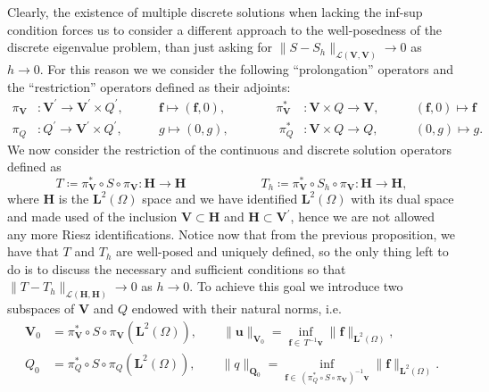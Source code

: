 \documentclass[USenglish]{article}
\theoremstyle{dgthm}
\theoremstyle{dgdef}
\let\vec\bm
\newcommand\norm[1]{\lVert#1\rVert}
\begin{document}
Clearly, the existence of multiple discrete solutions when lacking the inf-sup condition forces us to consider a different approach to the well-posedness of the discrete eigenvalue problem, than just asking for $\norm{S-S_h}_{\mathcal{L}(\vec{V},\vec{V})}\to 0$ as $h\to 0$.
For this reason we we consider the following ``prolongation'' operators and the ``restriction'' operators defined as their adjoints:
\begin{equation}
  \begin{aligned}
    \pi_{\vec{V}}&:\vec{V}^\prime \to \vec{V}^\prime\times Q^\prime, \qquad &\vec{f}\mapsto (\vec{f},0),  \qquad\qquad \pi_{\vec{V}}^\ast&:\vec{V}\times Q \to \vec{V}, \qquad &(\vec{f},0) \mapsto \vec{f}\\ 
    \pi_{Q}&:Q^\prime \to \vec{V}^\prime\times Q^\prime, \qquad &g\mapsto (0,g),  \qquad\qquad \pi_{Q}^\ast&:\vec{V}\times Q \to Q, \qquad &(0,g) \mapsto g.
  \end{aligned}
\end{equation}
We now consider the restriction of the continuous and discrete solution operators defined as
\begin{equation}
  T\coloneqq \pi_{\vec{V}}^\ast\circ S\circ \pi_{\vec{V}}:\vec{H}\to \vec{H} \qquad \qquad \qquad T_h\coloneqq \pi_{\vec{V}}^\ast\circ S_h\circ \pi_{\vec{V}}:\vec{H} \to \vec{H}, 
\end{equation}
where $\vec{H}$ is the $\vec{L}^2(\Omega)$ space and we have identified $\vec{L}^2(\Omega)$ with its dual space and made used of the inclusion $\vec{V}\subset \vec{H}$ and $\vec{H}\subset \vec{V}^\prime$, hence we are not allowed any more Riesz identifications.
Notice now that from the previous proposition, we have that $T$ and $T_h$ are well-posed and uniquely defined, so the only thing left to do is to discuss the necessary and sufficient conditions so that $\norm{T-T_h}_{\mathcal{L}(\vec{H},\vec{H})}\to 0$ as $h\to 0$.
To achieve this goal we introduce two subspaces of $\vec{V}$ and $Q$ endowed with their natural norms, i.e.
\begin{equation}
  \begin{aligned}
    \vec{V}_0 &= \pi_{\vec{V}}^\ast\circ S\circ \pi_{\vec{V}}\left(\vec{L}^2(\Omega)\right), \qquad \norm{\vec{u}}_{\vec{V}_0} = \underset{\vec{f}\in\, T^{-1}\vec{v}}{\inf}\norm{\vec{f}}_{\vec{L}^2(\Omega)},\\
    Q_0 &= \pi_{Q}^\ast\circ S\circ \pi_{Q}\left(\vec{L}^2(\Omega)\right), \qquad \norm{q}_{\vec{Q}_0} = \underset{\vec{f}\in\, (\pi_Q^\ast \circ S \circ \pi_{\vec{V}})^{-1}\vec{v}}{\inf}\norm{\vec{f}}_{\vec{L}^2(\Omega)}.
  \end{aligned}
\end{equation}
\end{document}
